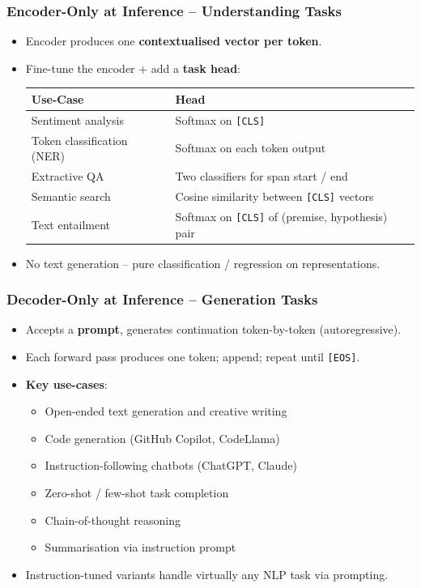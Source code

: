 \begin{frame}[fragile]\frametitle{Encoder-Only at Inference – Understanding Tasks}
\begin{itemize}
\item Encoder produces one \textbf{contextualised vector per token}.
\item Fine-tune the encoder + add a \textbf{task head}:
  \begin{center}
  \small
  \begin{tabular}{|l|p{5.5cm}|}
  \hline
  \textbf{Use-Case} & \textbf{Head} \\
  \hline
  Sentiment analysis & Softmax on \texttt{[CLS]} \\
  Token classification (NER) & Softmax on each token output \\
  Extractive QA & Two classifiers for span start / end \\
  Semantic search & Cosine similarity between \texttt{[CLS]} vectors \\
  Text entailment & Softmax on \texttt{[CLS]} of (premise, hypothesis) pair \\
  \hline
  \end{tabular}
  \end{center}
\item No text generation – pure classification / regression on representations.
\end{itemize}
\end{frame}

\begin{frame}[fragile]\frametitle{Decoder-Only at Inference – Generation Tasks}
\begin{itemize}
\item Accepts a \textbf{prompt}, generates continuation token-by-token (autoregressive).
\item Each forward pass produces one token; append; repeat until \texttt{[EOS]}.
\item \textbf{Key use-cases}:
  \begin{itemize}
  \item Open-ended text generation and creative writing
  \item Code generation (GitHub Copilot, CodeLlama)
  \item Instruction-following chatbots (ChatGPT, Claude)
  \item Zero-shot / few-shot task completion
  \item Chain-of-thought reasoning
  \item Summarisation via instruction prompt
  \end{itemize}
\item Instruction-tuned variants handle virtually any NLP task via prompting.
\end{itemize}
\end{frame}

